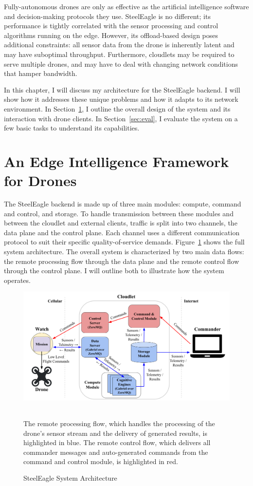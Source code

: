 Fully-autonomous drones are only as effective as the artificial intelligence software and decision-making protocols they use. SteelEagle is no different; its performance is tightly correlated with the sensor processing and control algorithms running on the edge. However, its offload-based design poses additional constraints: all sensor data from the drone is inherently latent and may have suboptimal throughput. Furthermore, cloudlets may be required to serve multiple drones, and may have to deal with changing network conditions that hamper bandwidth.

In this chapter, I will discuss my architecture for the SteelEagle backend. I will show how it addresses these unique problems and how it adapts to its network environment. In Section~\ref{sec:remote-intelligence-framework}, I outline the overall design of the system and its interaction with drone clients. In Section~\ref{sec:eval}, I evaluate the system on a few basic tasks to understand its capabilities.

\section{An Edge Intelligence Framework for Drones}
\label{sec:remote-intelligence-framework}
The SteelEagle backend is made up of three main modules: compute, command and control, and storage. To handle transmission between these modules and between the cloudlet and external clients, traffic is split into two channels, the data plane and the control plane. Each channel uses a different communication protocol to suit their specific quality-of-service demands. Figure~\ref{fig:sys-arch} shows the full system architecture. The overall system is characterized by two main data flows: the remote processing flow through the data plane and the remote control flow through the control plane. I will outline both to illustrate how the system operates.

\begin{figure}
    \centering
    \includegraphics[width=0.9\linewidth]{chapter4/FIGS/arch.png}
    \begin{captext}
    \\[0.1cm]
    \small The remote processing flow, which handles the processing of the drone's sensor stream and the delivery of generated results, is highlighted in blue. The remote control flow, which delivers all commander messages and auto-generated commands from the command and control module, is highlighted in red.
    \end{captext}
    \caption{SteelEagle System Architecture}
    \label{fig:sys-arch}
\end{figure}

